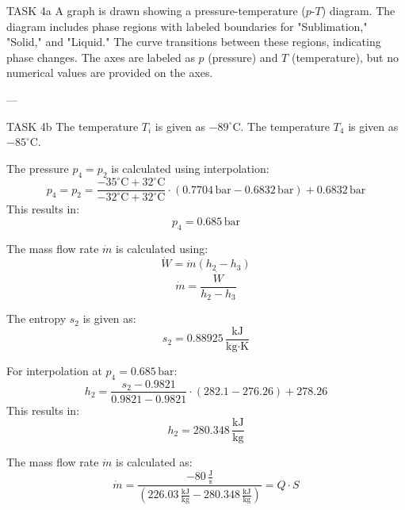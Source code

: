 TASK 4a  
A graph is drawn showing a pressure-temperature (\( p \)-\( T \)) diagram. The diagram includes phase regions with labeled boundaries for "Sublimation," "Solid," and "Liquid." The curve transitions between these regions, indicating phase changes. The axes are labeled as \( p \) (pressure) and \( T \) (temperature), but no numerical values are provided on the axes.

---

TASK 4b  
The temperature \( T_i \) is given as \( -89^\circ\text{C} \).  
The temperature \( T_4 \) is given as \( -85^\circ\text{C} \).  

The pressure \( p_4 = p_2 \) is calculated using interpolation:  
\[
p_4 = p_2 = \frac{-35^\circ\text{C} + 32^\circ\text{C}}{-32^\circ\text{C} + 32^\circ\text{C}} \cdot (0.7704 \, \text{bar} - 0.6832 \, \text{bar}) + 0.6832 \, \text{bar}
\]  
This results in:  
\[
p_4 = 0.685 \, \text{bar}
\]

The mass flow rate \( \dot{m} \) is calculated using:  
\[
\dot{W} = \dot{m} (h_2 - h_3)
\]  
\[
\dot{m} = \frac{\dot{W}}{h_2 - h_3}
\]

The entropy \( s_2 \) is given as:  
\[
s_2 = 0.88925 \, \frac{\text{kJ}}{\text{kg·K}}
\]

For interpolation at \( p_4 = 0.685 \, \text{bar} \):  
\[
h_2 = \frac{s_2 - 0.9821}{0.9821 - 0.9821} \cdot (282.1 - 276.26) + 278.26
\]  
This results in:  
\[
h_2 = 280.348 \, \frac{\text{kJ}}{\text{kg}}
\]

The mass flow rate \( \dot{m} \) is calculated as:  
\[
\dot{m} = \frac{-80 \, \frac{\text{J}}{\text{s}}}{(226.03 \, \frac{\text{kJ}}{\text{kg}} - 280.348 \, \frac{\text{kJ}}{\text{kg}})} = Q \cdot S
\]